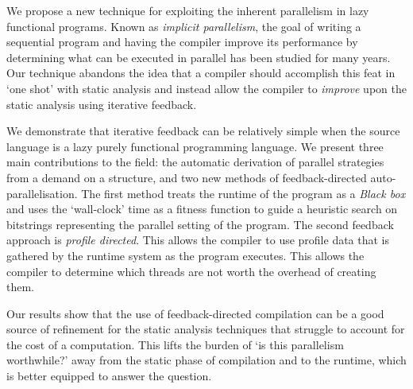 We propose a new technique for exploiting the inherent parallelism in lazy
functional programs. Known as \emph{implicit parallelism}, the goal of writing
a sequential program and having the compiler improve its performance by
determining what can be executed in parallel has been studied for many years.
Our technique abandons the idea that a compiler should accomplish this feat in
`one shot' with static analysis and instead allow the compiler to
\emph{improve} upon the static analysis using iterative feedback.

We demonstrate that iterative feedback can be relatively simple when the source
language is a lazy purely functional programming language. We present three
main contributions to the field: the automatic derivation of parallel
strategies from a demand on a structure, and two new methods of
feedback-directed auto-parallelisation. The first method treats the runtime of
the program as a \emph{Black box} and uses the `wall-clock' time as a fitness
function to guide a heuristic search on bitstrings representing the parallel
setting of the program. The second feedback approach is \emph{profile
directed}. This allows the compiler to use profile data that is gathered by the
runtime system as the program executes. This allows the compiler to determine
which threads are not worth the overhead of creating them.

Our results show that the use of feedback-directed compilation can be a good
source of refinement for the static analysis techniques that struggle to
account for the cost of a computation. This lifts the burden of `is this
parallelism worthwhile?' away from the static phase of compilation and to the
runtime, which is better equipped to answer the question.
